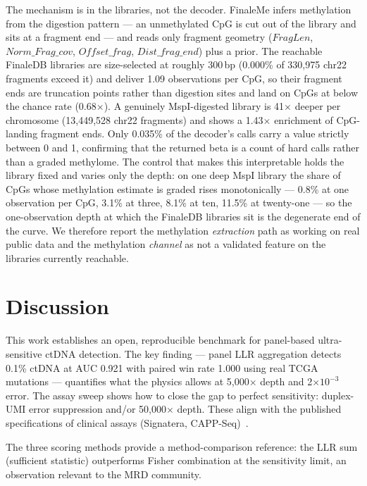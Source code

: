 \documentclass[11pt]{article}
\begin{document}
The mechanism is in the libraries, not the decoder. FinaleMe infers methylation from the digestion pattern --- an unmethylated CpG is cut out of the library and sits at a fragment end --- and reads only fragment geometry ($FragLen$, $Norm\_Frag\_cov$, $Offset\_frag$, $Dist\_frag\_end$) plus a prior. The reachable FinaleDB libraries are size-selected at roughly 300\,bp (0.000\% of 330,975 chr22 fragments exceed it) and deliver 1.09 observations per CpG, so their fragment ends are truncation points rather than digestion sites and land on CpGs at below the chance rate (0.68$\times$). A genuinely MspI-digested library is 41$\times$ deeper per chromosome (13,449,528 chr22 fragments) and shows a 1.43$\times$ enrichment of CpG-landing fragment ends. Only 0.035\% of the decoder's calls carry a value strictly between 0 and 1, confirming that the returned beta is a count of hard calls rather than a graded methylome. The control that makes this interpretable holds the library fixed and varies only the depth: on one deep MspI library the share of CpGs whose methylation estimate is graded rises monotonically --- 0.8\% at one observation per CpG, 3.1\% at three, 8.1\% at ten, 11.5\% at twenty-one --- so the one-observation depth at which the FinaleDB libraries sit is the degenerate end of the curve. We therefore report the methylation \emph{extraction} path as working on real public data and the methylation \emph{channel} as not a validated feature on the libraries currently reachable.

\section{Discussion}
\label{sec:discussion}

This work establishes an open, reproducible benchmark for panel-based ultra-sensitive ctDNA detection. The key finding --- panel LLR aggregation detects 0.1\% ctDNA at AUC 0.921 with paired win rate 1.000 using real TCGA mutations --- quantifies what the physics allows at 5,000$\times$ depth and 2$\times10^{-3}$ error. The assay sweep shows how to close the gap to perfect sensitivity: duplex-UMI error suppression and/or 50,000$\times$ depth. These align with the published specifications of clinical assays (Signatera, CAPP-Seq)~\cite{reiner2019, newman2014, newman2016}.

The three scoring methods provide a method-comparison reference: the LLR sum (sufficient statistic) outperforms Fisher combination at the sensitivity limit, an observation relevant to the MRD community.
\end{document}
